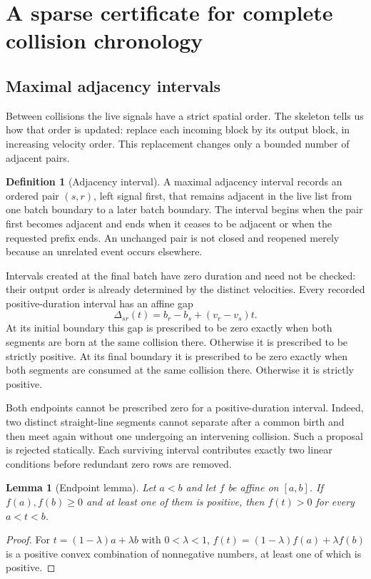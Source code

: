 \documentclass[11pt,letterpaper]{article}
\numberwithin{equation}{section}
\newtheorem{lemma}[theorem]{Lemma}
\theoremstyle{definition}
\newtheorem{definition}[theorem]{Definition}
\theoremstyle{remark}
\begin{document}
\section{A sparse certificate for complete collision chronology}
\label{smc:cg:sec:sparse}

\subsection{Maximal adjacency intervals}

Between collisions the live signals have a strict spatial order. The
skeleton tells us how that order is updated: replace each incoming block by
its output block, in increasing velocity order. This replacement changes
only a bounded number of adjacent pairs.

\begin{definition}[Adjacency interval]
A maximal adjacency interval records an ordered pair $(s,r)$, left signal
first, that remains adjacent in the live list from one batch boundary to a
later batch boundary. The interval begins when the pair first becomes
adjacent and ends when it ceases to be adjacent or when the requested prefix
ends. An unchanged pair is not closed and reopened merely because an
unrelated event occurs elsewhere.
\end{definition}

Intervals created at the final batch have zero duration and need not be
checked: their output order is already determined by the distinct velocities.
Every recorded positive-duration interval has an affine gap
\begin{equation}
 \Delta_{sr}(t)=b_r-b_s+(v_r-v_s)t.
 \label{smc:cg:eq:gapline}
\end{equation}
At its initial boundary this gap is prescribed to be zero exactly when both
segments are born at the same collision there. Otherwise it is prescribed
to be strictly positive. At its final boundary it is prescribed to be zero
exactly when both segments are consumed at the same collision there.
Otherwise it is strictly positive.

Both endpoints cannot be prescribed zero for a positive-duration interval.
Indeed, two distinct straight-line segments cannot separate after a common
birth and then meet again without one undergoing an intervening collision.
Such a proposal is rejected statically. Each surviving interval contributes
exactly two linear conditions before redundant zero rows are removed.

\begin{lemma}[Endpoint lemma]\label{smc:cg:lem:endpoint}
Let $a<b$ and let $f$ be affine on $[a,b]$. If $f(a),f(b)\ge0$ and at least
one of them is positive, then $f(t)>0$ for every $a<t<b$.
\end{lemma}
\begin{proof}
For $t=(1-\lambda)a+\lambda b$ with $0<\lambda<1$,
$f(t)=(1-\lambda)f(a)+\lambda f(b)$ is a positive convex combination of
nonnegative numbers, at least one of which is positive.
\end{proof}
\end{document}

